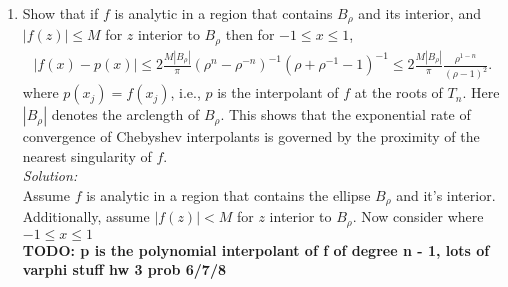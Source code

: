 \documentclass[10pt]{amsart}
\newcommand{\I}{\mathrm{i}}
\DeclareMathOperator{\E}{e}
\theoremstyle{nonumberplain}
\begin{document}
\begin{enumerate}[label={\bf {\arabic*}:}]
\begin{enumerate}
\noindent
\textit{Solution:} \\
Let's consider the image of a circle with radius $\rho > 1$, if we parameterize this with $z = \rho \E^{\I \theta}$ and plug this in to $J(w)$ we have
\begin{align*}
J(\rho\E^{\I \theta})
	&= \frac 1 2 \left( \rho\E^{\I \theta} + \frac 1 \rho \E^{-\I \theta} \right) \\
	&= \frac 1 2 \left( \rho \cos \theta + \rho \sin \theta + \frac 1 \rho \cos \theta - \I \frac 1 \rho \sin \theta \right) \\
	&= \frac 1 2 \left( \left( \rho + \frac 1 \rho\right) \cos \theta + \I \left( \rho  - \frac 1 \rho \right) \sin \theta \right).
\end{align*}
Notice this is the equation of an ellipse since it is a slightly stretched and flattened out circle.
This is almost a circle of radius $\rho$ but it is slightly stretched in different amounts in the $x$ (real) and $y$ (imaginary) directions.
Therefore the image is an ellipse. \\
\qed \\

\item Show that if $f$ is analytic in a region that contains $B_\rho$ and its interior, and $|f(z)| \leq M$ for $z$ interior to $B_\rho$ then for $-1 \leq x \leq 1$,
\begin{align*}
|f(x) - p(x)| \leq 2 \frac{M | B_\rho| }{\pi}  (\rho^n - \rho^{-n})^{-1} (\rho + \rho^{-1} - 1)^{-1} \leq 2 \frac{M | B_\rho| }{\pi} \frac{\rho^{1-n}}{(\rho - 1)^2}.
\end{align*}
where $p(x_j) = f(x_j)$, i.e., $p$ is the interpolant of $f$ at the roots of $T_n$. 
Here $|B_\rho|$ denotes the arclength of $B_\rho$.  This shows that the exponential rate of convergence of Chebyshev interpolants is governed by the proximity of the nearest singularity of $f$. \\

\noindent
\textit{Solution:} \\
Assume $f$ is analytic in a region that contains the ellipse $B_\rho$ and it's interior.
Additionally, assume $|f(z)| < M$ for $z$ interior to $B_\rho$.
Now consider where $-1 \leq x \leq 1$ 
\\

\textbf{TODO: p is the polynomial interpolant of f of degree n - 1, lots of varphi stuff hw 3 prob 6/7/8}
\begin{align*}
\end{align*}
      

\end{enumerate}
\end{enumerate}
\end{document}
